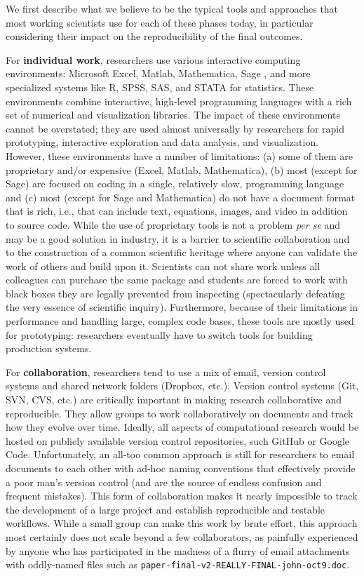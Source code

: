 \documentclass[ChapterTOCs,krantz2]{krantz} %
\theoremstyle{definition}
\begin{document}
We first describe what we believe to be the typical tools and approaches that
most working scientists use for each of these phases today, in particular
considering their impact on the reproducibility of the final outcomes. 

For \textbf{individual work}, researchers use various interactive
computing environments: Microsoft Excel, Matlab, Mathematica\textregistered,
Sage \cite{sage}, and more specialized systems like R, SPSS, SAS, and STATA for
statistics. These environments combine interactive, high-level programming
languages with a rich set of numerical and visualization libraries. The impact
of these environments cannot be overstated; they are used almost universally by
researchers for rapid prototyping, interactive exploration and data analysis,
and visualization. However, these environments have a number of limitations:
(a) some of them are proprietary and/or expensive (Excel, Matlab, Mathematica),
(b) most (except for Sage) are focused on coding in a single, relatively slow,
programming language and (c) most (except for Sage and Mathematica) do not have
a document format that is rich, i.e., that can include text, equations, images,
and video in addition to source code. While the use of proprietary tools is not
a problem \emph{per se} and may be a good solution in industry, it is a barrier
to scientific collaboration and to the construction of a common scientific
heritage where anyone can validate the work of others and build upon it.
Scientists can not share work unless all colleagues can purchase the same
package and students are forced to work with black boxes they are legally
prevented from inspecting (spectacularly defeating the very essence of
scientific inquiry). Furthermore, because of their limitations in performance
and handling large, complex code bases, these tools are mostly used for
prototyping: researchers eventually have to switch tools for building
production systems.

For \textbf{collaboration}, researchers tend to use a mix of email, version
control systems and shared network folders (Dropbox, etc.).  Version control
systems (Git, SVN, CVS, etc.) are critically important in making research
collaborative and reproducible. They allow groups to work collaboratively on
documents and track how they evolve over time. Ideally, all aspects of
computational research would be hosted on publicly available version control
repositories, such GitHub or Google Code. Unfortunately, an all-too common
approach is still for researchers to email documents to each other with ad-hoc
naming conventions that effectively provide a poor man's version control (and
are the source of endless confusion and frequent mistakes). This form of
collaboration makes it nearly impossible to track the development of a large
project and establish reproducible and testable workflows.  While a small group
can make this work by brute effort, this approach most certainly does not scale
beyond a few collaborators, as painfully experienced by anyone who has
participated in the madness of a flurry of email attachments with oddly-named
files such as {\tt paper-final-v2-REALLY-FINAL-john-oct9.doc}.
\end{document}
